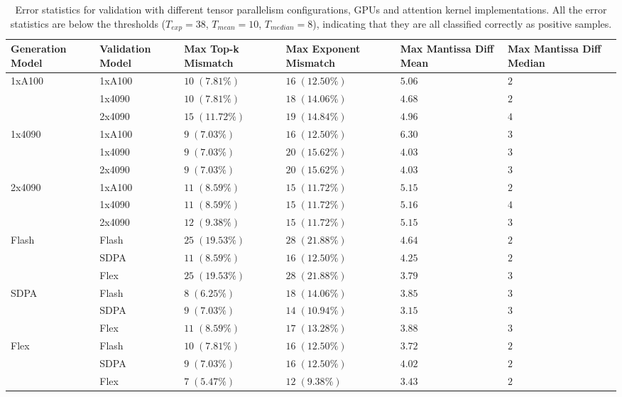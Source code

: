 \documentclass{article}
\theoremstyle{plain}
\theoremstyle{definition}
\theoremstyle{remark}
\begin{document}
\begin{table}[ht]
\caption{Error statistics for validation with different tensor parallelism configurations, GPUs and attention kernel implementations.
All the error statistics are below the thresholds ($T_{exp}=38$, $T_{mean}=10$, $T_{median}=8$), indicating that they are all classified correctly as positive samples.
}
\label{tab:robust_errs}
\vskip 0.15in
\begin{center}
\small
\begin{tabular}{p{2cm} p{2cm} p{2.3cm} p{2.3cm} p{2.2cm} p{2.2cm}}
\toprule
Generation \newline Model & Validation \newline Model & Max Top-k \newline Mismatch & Max Exponent \newline Mismatch & Max Mantissa \newline Diff Mean & Max Mantissa \newline Diff Median \\
\midrule
1xA100 & 1xA100 & $10\;(7.81\%)$ & $16\;(12.50\%)$ & $5.06$ & $2$ \\
 & 1x4090 & $10\;(7.81\%)$ & $18\;(14.06\%)$ & $4.68$ & $2$ \\
 & 2x4090 & $15\;(11.72\%)$ & $19\;(14.84\%)$ & $4.96$ & $4$ \\
\cmidrule(lr){1-6}
1x4090 & 1xA100 & $9\;(7.03\%)$ & $16\;(12.50\%)$ & $6.30$ & $3$ \\
 & 1x4090 & $9\;(7.03\%)$ & $20\;(15.62\%)$ & $4.03$ & $3$ \\
 & 2x4090 & $9\;(7.03\%)$ & $20\;(15.62\%)$ & $4.03$ & $3$ \\
\cmidrule(lr){1-6}
2x4090 & 1xA100 & $11\;(8.59\%)$ & $15\;(11.72\%)$ & $5.15$ & $2$ \\
 & 1x4090 & $11\;(8.59\%)$ & $15\;(11.72\%)$ & $5.16$ & $4$ \\
 & 2x4090 & $12\;(9.38\%)$ & $15\;(11.72\%)$ & $5.15$ & $3$ \\
\cmidrule(lr){1-6}
Flash & Flash & $25\;(19.53\%)$ & $28\;(21.88\%)$ & $4.64$ & $2$ \\
 & SDPA & $11\;(8.59\%)$ & $16\;(12.50\%)$ & $4.25$ & $2$ \\
 & Flex & $25\;(19.53\%)$ & $28\;(21.88\%)$ & $3.79$ & $3$ \\
\cmidrule(lr){1-6}
SDPA & Flash & $8\;(6.25\%)$ & $18\;(14.06\%)$ & $3.85$ & $3$ \\
 & SDPA & $9\;(7.03\%)$ & $14\;(10.94\%)$ & $3.15$ & $3$ \\
 & Flex & $11\;(8.59\%)$ & $17\;(13.28\%)$ & $3.88$ & $3$ \\
\cmidrule(lr){1-6}
Flex & Flash & $10\;(7.81\%)$ & $16\;(12.50\%)$ & $3.72$ & $2$ \\
 & SDPA & $9\;(7.03\%)$ & $16\;(12.50\%)$ & $4.02$ & $2$ \\
 & Flex & $7\;(5.47\%)$ & $12\;(9.38\%)$ & $3.43$ & $2$ \\
\bottomrule
\end{tabular}
\end{center}
\vskip -0.1in
\end{table}
\end{document}

